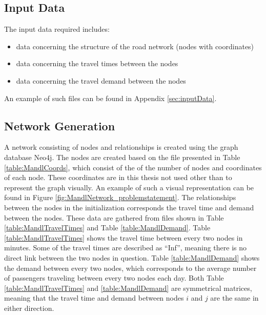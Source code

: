\subsection{Input Data}
The input data required includes:
\begin{itemize}
\item data concerning the structure of the road network (nodes with coordinates)
\item data concerning the travel times between the nodes
\item data concerning the travel demand between the nodes
\end{itemize}
An example of such files can be found in Appendix \vref{sec:inputData}.

\subsection{Network Generation}
\label{subsec:networkGeneration}

A network consisting of nodes and relationships is created using the graph database Neo4j. The nodes are created based on the file presented in Table \vref{table:MandlCoords}, which consist of the of the number of nodes and coordinates of each node. These coordinates are in this thesis not used other than to represent the graph visually. An example of such a visual representation can be found in Figure \vref{fig:MandlNetwork_problemstatement}. The relationships between the nodes in the initialization corresponds the travel time and demand between the nodes. These data are gathered from files shown in Table 
\vref{table:MandlTravelTimes} and Table \vref{table:MandlDemand}. Table \ref{table:MandlTravelTimes} shows the travel time between every two nodes in minutes. Some of the travel times are described as ``Inf'', meaning there is no direct link between the two nodes in question. Table \ref{table:MandlDemand} shows the demand between every two nodes, which corresponds to the average number of passengers traveling between every two nodes each day. Both Table \ref{table:MandlTravelTimes} and \ref{table:MandlDemand} are symmetrical matrices, meaning that the travel time and demand between nodes $i$ and $j$ are the same in either direction. 


